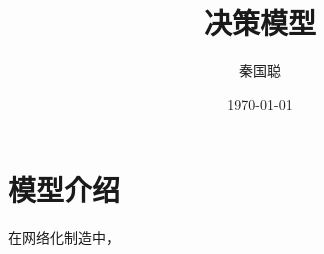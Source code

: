 \documentclass[UTF8]{ctexart}
\title{决策模型}
\author{秦国聪}
\date{\today}
\begin{document}
\maketitle
\section{模型介绍}
在网络化制造中，
\end{document}
